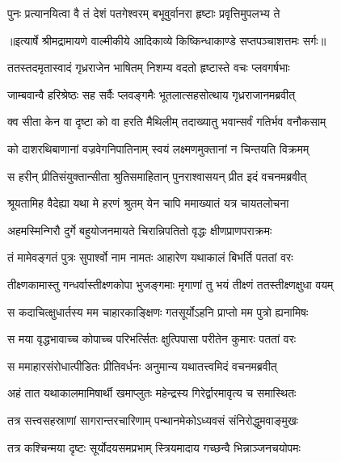 \twolineshloka
{पुनः प्रत्यानयित्वा वै तं देशं पतगेश्वरम्}
{बभूवुर्वानरा हृष्टाः प्रवृत्तिमुपलभ्य ते} %


{॥इत्यार्षे श्रीमद्रामायणे वाल्मीकीये आदिकाव्ये किष्किन्धाकाण्डे सप्तपञ्चाशत्तमः सर्गः॥}


\twolineshloka
{ततस्तदमृतास्वादं गृध्रराजेन भाषितम्}
{निशम्य वदतो हृष्टास्ते वचः प्लवगर्षभाः} %

\twolineshloka
{जाम्बवान्वै हरिश्रेष्ठः सह सर्वैः प्लवङ्गमैः}
{भूतलात्सहसोत्थाय गृध्रराजानमब्रवीत्} %

\twolineshloka
{क्व सीता केन वा दृष्टा को वा हरति मैथिलीम्}
{तदाख्यातु भवान्सर्वं गतिर्भव वनौकसाम्} %

\twolineshloka
{को दाशरथिबाणानां वज्रवेगनिपातिनाम्}
{स्वयं लक्ष्मणमुक्तानां न चिन्तयति विक्रमम्} %

\twolineshloka
{स हरीन् प्रीतिसंयुक्तान्सीता श्रुतिसमाहितान्}
{पुनराश्वासयन् प्रीत इदं वचनमब्रवीत्} %

\twolineshloka
{श्रूयतामिह वैदेह्या यथा मे हरणं श्रुतम्}
{येन चापि ममाख्यातं यत्र चायतलोचना} %

\twolineshloka
{अहमस्मिन्गिरौ दुर्गे बहुयोजनमायते}
{चिरान्निपतितो वृद्धः क्षीणप्राणपराक्रमः} %

\twolineshloka
{तं मामेवङ्गतं पुत्रः सुपार्श्वो नाम नामतः}
{आहारेण यथाकालं बिभर्ति पततां वरः} %

\twolineshloka
{तीक्ष्णकामास्तु गन्धर्वास्तीक्ष्णकोपा भुजङ्गमाः}
{मृगाणां तु भयं तीक्ष्णं ततस्तीक्ष्णक्षुधा वयम्} %

\twolineshloka
{स कदाचित्क्षुधार्तस्य मम चाहारकाङ्क्षिणः}
{गतसूर्योऽहनि प्राप्तो मम पुत्रो ह्यनामिषः} %

\twolineshloka
{स मया वृद्धभावाच्च कोपाच्च परिभर्त्सितः}
{क्षुत्पिपासा परीतेन कुमारः पततां वरः} %

\twolineshloka
{स ममाहारसंरोधात्पीडितः प्रीतिवर्धनः}
{अनुमान्य यथातत्त्वमिदं वचनमब्रवीत्} %

\twolineshloka
{अहं तात यथाकालमामिषार्थी खमाप्लुतः}
{महेन्द्रस्य गिरेर्द्वारमावृत्य च समास्थितः} %

\twolineshloka
{तत्र सत्त्वसहस्राणां सागरान्तरचारिणाम्}
{पन्थानमेकोऽध्यवसं संनिरोद्धुमवाङ्मुखः} %

\twolineshloka
{तत्र कश्चिन्मया दृष्टः सूर्योदयसमप्रभाम्}
{स्त्रियमादाय गच्छन्वै भिन्नाञ्जनचयोपमः} %

